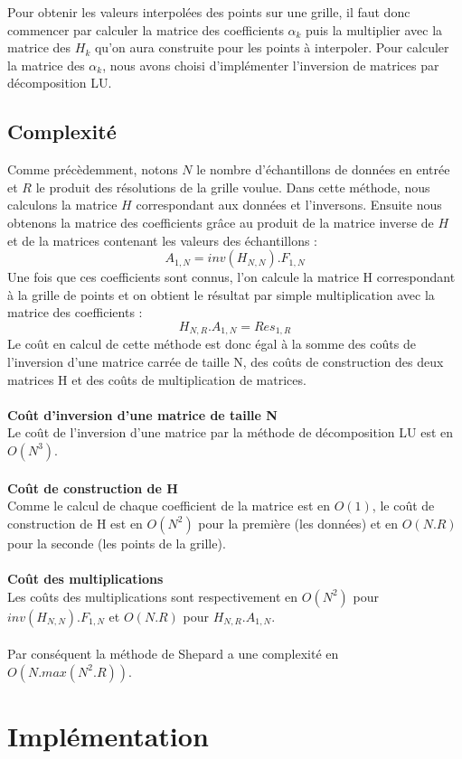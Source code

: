 \documentclass[a4paper,9pt]{article}
\begin{document}
Pour obtenir les valeurs interpolées des points sur une grille, il faut donc commencer par calculer la matrice des coefficients $\alpha_{k}$ puis la multiplier avec la matrice des $H_{k}$ qu'on aura construite pour les points à interpoler. Pour calculer la matrice des $\alpha_{k}$, nous avons choisi d'implémenter l'inversion de matrices par décomposition LU.

\subsection{Complexité}
\label{subsec:hardy_complexite}
Comme précèdemment, notons $N$ le nombre d'échantillons de données en entrée et $R$ le produit des résolutions de la grille voulue.
Dans cette méthode, nous calculons la matrice $H$ correspondant aux données et l'inversons. Ensuite nous obtenons la matrice des coefficients grâce au produit de la matrice inverse de $H$ et de la matrices contenant les valeurs des échantillons :
$$A_{1,N} = inv(H_{N,N}).F_{1,N}$$
Une fois que ces coefficients sont connus, l'on calcule la matrice H correspondant à la grille de points et on obtient le résultat par simple multiplication avec la matrice des coefficients :
$$H_{N,R}.A_{1,N}=Res_{1,R}$$
Le coût en calcul de cette méthode est donc égal à la somme des coûts de l'inversion d'une matrice carrée de taille N, des coûts de construction des deux matrices H et des coûts de multiplication de matrices.\\\\
\textbf{Coût d'inversion d'une matrice de taille N}\\
Le coût de l'inversion d'une matrice par la méthode de décomposition LU est en $O(N^{3})$.\\\\
\textbf{Coût de construction de H}\\
Comme le calcul de chaque coefficient de la matrice est en $O(1)$, le coût de construction de H est en $O(N^{2})$ pour la première (les données) et en $O(N.R)$ pour la seconde (les points de la grille).\\\\
\textbf{Coût des multiplications}\\
Les coûts des multiplications sont respectivement en $O(N^{2})$ pour $inv(H_{N,N}).F_{1,N}$ et $O(N.R)$ pour $H_{N,R}.A_{1,N}$.\\\\
Par conséquent la méthode de Shepard a une complexité en \textbf{$O(N.max(N^{2}.R))$}.


\section{Implémentation}
\label{sec:implementation}
\end{document}
